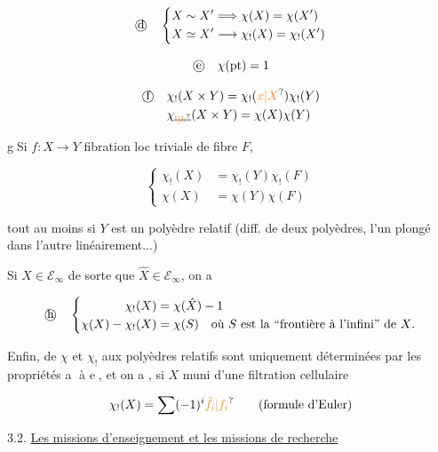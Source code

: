 \[
\text{\textcircled{d}}\quad\left\{\begin{aligned}
X\sim X' &\Longrightarrow \chi(X)=\chi(X')\\
X\simeq X' &\longrightarrow \chi_!(X)=\chi_!(X')
\end{aligned}\right.
\]

\[
\text{\textcircled{e}}\quad\chi(\mathrm{pt})=1
\]

\[
\begin{aligned}
\text{\textcircled{f}}\quad&\chi_!(X\times Y)=\chi_!(\unsure{x|X})\chi_!(Y)\\
&\chi_{\deleted{\unsure{!|h}}}(X\times Y)=\chi(X)\chi(Y)
\end{aligned}
\]

\textcircled{g}\quad Si $f:X\longrightarrow Y$ fibration loc triviale de fibre $F$,

\[
\left\{\begin{aligned}
\chi_!(X)&=\chi_!(Y)\chi_!(F)\\
\chi(X)&=\chi(Y)\chi(F)
\end{aligned}\right.
\]

tout au moins si $Y$ est un polyèdre relatif (diff. de deux polyèdres, l'un plongé dans l'autre linéairement...)


Si  $X\in\mathcal E_\infty$ de sorte que $\hat X\in\mathcal E_\infty$, on a

\[
\text{\textcircled{h}}\quad\left\{\begin{aligned}
\chi_!(X)&=\chi(\hat X)-1\\
\chi(X)-\chi_!(X)&=\chi(S)\quad\text{où $S$ est la ``frontière à l'infini'' de $X$.}
\end{aligned}\right.
\]

Enfin,  de  $\chi$ et $\chi_!$ aux polyèdres relatifs sont uniquement déterminées par les propriétés \textcircled{a} à \textcircled{e}, et on a , si $X$ muni d'une filtration cellulaire


\[
\chi_!(X)=\sum(-1)^i\unsure{\hat f_i|f_i}\qquad\text{(formule d'Euler)}
\]


3.2. \uline{Les missions d'enseignement et les missions de recherche}

